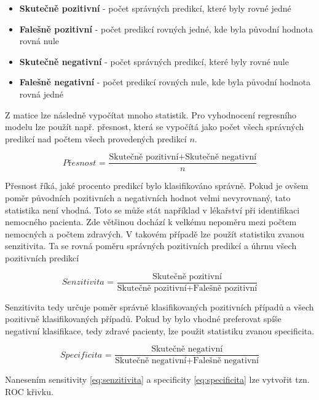 \begin{itemize}
    \item \textbf{Skutečně pozitivní} - počet správných predikcí, které byly rovné jedné
    \item \textbf{Falešně pozitivní} - počet predikcí rovných jedné, kde byla původní hodnota rovná nule
    \item \textbf{Skutečně negativní} - počet správných predikcí, které byly rovné nule
    \item \textbf{Falešně negativní} - počet predikcí rovných nule, kde byla původní hodnota rovná jedné
\end{itemize}

Z matice lze následně vypočítat mnoho statistik. Pro vyhodnocení regresního modelu lze použít např. přesnost, která se vypočítá jako počet všech správných predikcí nad
počtem všech provedených predikcí $n$.

\begin{equation}
    \textit{Přesnost = } \frac{\text{Skutečně pozitivní} + \text{Skutečně negativní}}{n}
\end{equation}

{\color{red}
Přesnost říká, jaké procento predikcí bylo klasifikováno správně. Pokud je ovšem poměr původních pozitivních a negativních hodnot velmi nevyrovnaný, tato statistika
není vhodná. Toto se může stát například v lékařství při identifikaci nemocného pacienta. Zde většinou dochází k velkému nepoměru mezi počtem nemocných a počtem zdravých.
V takovém případě lze použít statistiku zvanou senzitivita. Ta se rovná poměru správných pozitivních predikcí a úhrnu všech pozitivních predikcí

\begin{equation}
    \label{eq:senzitivita}
    \textit{Senzitivita = } \frac{\text{Skutečně pozitivní}}{\text{Skutečně pozitivní} + \text{Falešně pozitivní}}
\end{equation}

Senzitivita tedy určuje poměr správně klasifikovaných pozitivních případů a všech pozitivně klasifikovaných případů. Pokud by bylo vhodné preferovat
spíše negativní klasifikace, tedy zdravé pacienty, lze použit statistiku zvanou specificita.

\begin{equation}
    \label{eq:specificita}
    \textit{Specificita = } \frac{\text{Skutečně negativní}}{\text{Skutečně negativní} + \text{Falešně negativní}}
\end{equation}

Nanesením sensitivity \ref{eq:senzitivita} a specificity \ref{eq:specificita} lze vytvořit tzn. ROC křivku.
}

